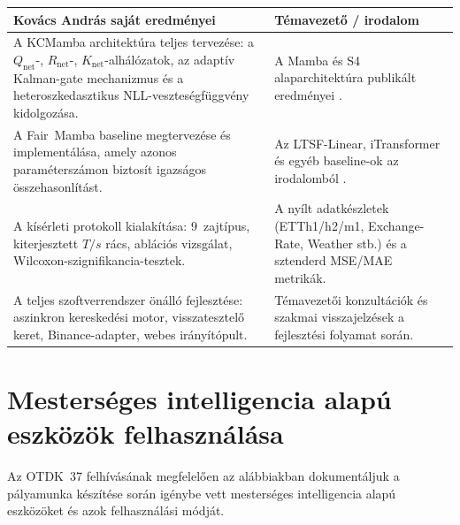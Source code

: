 \documentclass[
]{elteikthesis}[2024/04/26]
\begin{document}
\begin{center}
\begin{tabular}{|p{7.0cm}|p{7.0cm}|}
\hline
\textbf{Kovács András saját eredményei} & \textbf{Témavezető / irodalom} \\
\hline
A KCMamba architektúra teljes tervezése: a
$Q_\text{net}$-, $R_\text{net}$-, $K_\text{net}$-alhálózatok,
az adaptív Kalman-gate mechanizmus és a
heteroszkedasztikus NLL-veszteségfüggvény kidolgozása. &
A Mamba és S4 alaparchitektúra publikált eredményei
\cite{gu2023mamba,gu2021s4}. \\
\hline
A Fair~Mamba baseline megtervezése és implementálása,
amely azonos paraméterszámon biztosít igazságos összehasonlítást. &
Az LTSF-Linear, iTransformer és egyéb baseline-ok
az irodalomból \cite{zeng2023transformers,liu2023itransformer}. \\
\hline
A kísérleti protokoll kialakítása: 9~zajtípus,
kiterjesztett $T/s$ rács, ablációs vizsgálat,
Wilcoxon-szignifikancia-tesztek. &
A nyílt adatkészletek (ETTh1/h2/m1, Exchange-Rate,
Weather stb.) és a sztenderd MSE/MAE metrikák. \\
\hline
A teljes szoftverrendszer önálló fejlesztése:
aszinkron kereskedési motor, visszatesztelő
keret, Binance-adapter, webes irányítópult. &
Témavezetői konzultációk és szakmai visszajelzések
a fejlesztési folyamat során. \\
\hline
\end{tabular}
\end{center}

\appendix
% 
% 

\chapter{Mesterséges intelligencia alapú eszközök felhasználása}
\label{app:ai}

Az OTDK~37 felhívásának megfelelően az alábbiakban dokumentáljuk a pályamunka
készítése során igénybe vett mesterséges intelligencia alapú eszközöket és
azok felhasználási módját.
\end{document}
